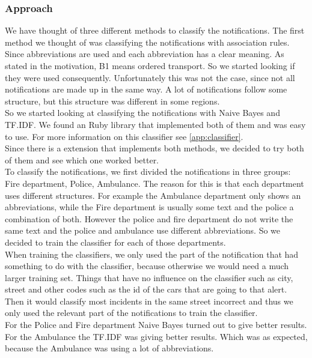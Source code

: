\subsubsection*{Approach}
We have thought of three different methods to classify the notifications.
The first method we thought of was classifying the notifications with association rules.
Since abbreviations are used and each abbreviation has a clear meaning. 
As stated in the motivation, B1 means ordered transport. 
So we started looking if they were used consequently. 
Unfortunately this was not the case, since not all notifications are made up in the same way. 
A lot of notifications follow some structure, but this structure was different in some regions. \\
So we started looking at classifying the notifications with Naive Bayes and TF.IDF. 
We found an Ruby library that implemented both of them and was easy to use. 
For more information on this classifier see \autoref{app:classifier}. \\
Since there is a extension that implements both methods, we decided to try both of them and see which one worked better.\\
To classify the notifications, we first divided the notifications in three groups: Fire department, Police, Ambulance.
The reason for this is that each department uses different structures. For example the Ambulance department only shows an abbreviations, while the Fire department is usually some text and the police a combination of both. 
However the police and fire department do not write the same text and the police and ambulance use different abbreviations. So we decided to train the classifier for each of those departments. \\
When training the classifiers, we only used the part of the notification that had something to do with the classifier, because otherwise we would need a much larger training set. 
Things that have no influence on the classifier such as city, street and other codes such as the id of the cars that are going to that alert. Then it would classify most incidents in the same street incorrect and thus we only used the relevant part of the notifications to train the classifier. \\
For the Police and Fire department Naive Bayes turned out to give better results. For the Ambulance the TF.IDF was giving better results. Which was as expected, because the Ambulance was using a lot of abbreviations. 

